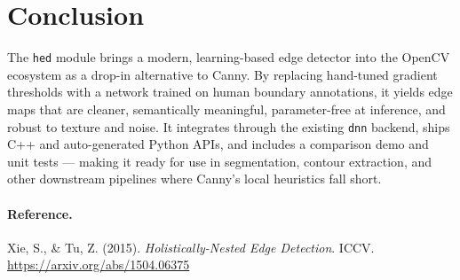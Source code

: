 \documentclass[11pt]{article}
\begin{document}
\section{Conclusion}

The \texttt{hed} module brings a modern, learning-based edge detector into the
OpenCV ecosystem as a drop-in alternative to Canny. By replacing hand-tuned
gradient thresholds with a network trained on human boundary annotations, it yields
edge maps that are cleaner, semantically meaningful, parameter-free at inference,
and robust to texture and noise. It integrates through the existing \texttt{dnn}
backend, ships C++ and auto-generated Python APIs, and includes a comparison demo
and unit tests --- making it ready for use in segmentation, contour extraction, and
other downstream pipelines where Canny's local heuristics fall short.

\paragraph{Reference.}
Xie, S., \& Tu, Z. (2015). \emph{Holistically-Nested Edge Detection}. ICCV.
\url{https://arxiv.org/abs/1504.06375}
\end{document}
